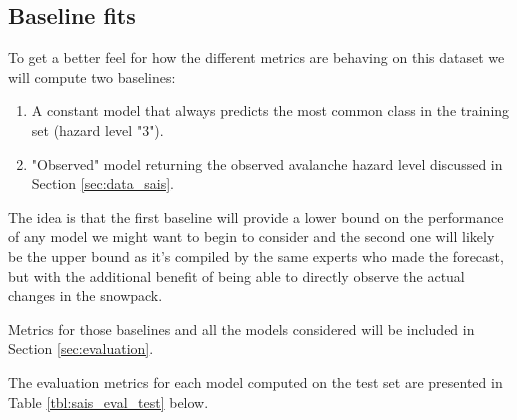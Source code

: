 \documentclass{article}
\begin{document}
\subsection{Baseline fits}

To get a better feel for how the different metrics are behaving on this dataset we will compute two baselines: 
\begin{enumerate}
	\item A constant model that always predicts the most common class in the training set (hazard level "3").
	\item "Observed" model returning the observed avalanche hazard level discussed in Section \ref{sec:data_sais}.
\end{enumerate}
The idea is that the first baseline will provide a lower bound on the performance of any model we might want to begin to consider and the second one will likely be the upper bound as it's compiled by the same experts who made the forecast, but with the additional benefit of being able to directly observe the actual changes in the snowpack.

Metrics for those baselines and all the models considered will be included in Section \ref{sec:evaluation}.

	The evaluation metrics for each model computed on the test set are presented in Table \ref{tbl:sais_eval_test} below. 


	
\end{document}
